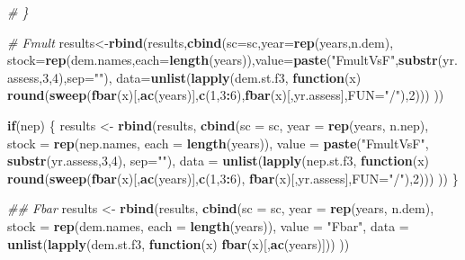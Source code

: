 \documentclass[
]{article}
\newenvironment{Shaded}{\begin{snugshade}}{\end{snugshade}}
\newcommand{\CommentTok}[1]{\textcolor[rgb]{0.56,0.35,0.01}{\textit{#1}}}
\newcommand{\ControlFlowTok}[1]{\textcolor[rgb]{0.13,0.29,0.53}{\textbf{#1}}}
\newcommand{\DataTypeTok}[1]{\textcolor[rgb]{0.13,0.29,0.53}{#1}}
\newcommand{\DecValTok}[1]{\textcolor[rgb]{0.00,0.00,0.81}{#1}}
\newcommand{\KeywordTok}[1]{\textcolor[rgb]{0.13,0.29,0.53}{\textbf{#1}}}
\newcommand{\NormalTok}[1]{#1}
\newcommand{\OperatorTok}[1]{\textcolor[rgb]{0.81,0.36,0.00}{\textbf{#1}}}
\newcommand{\StringTok}[1]{\textcolor[rgb]{0.31,0.60,0.02}{#1}}
\begin{document}
\begin{Shaded}
\begin{Highlighting}[]
{{{{{ \CommentTok{#   \}}

    \CommentTok{# Fmult}
\NormalTok{    results<-}\KeywordTok{rbind}\NormalTok{(results,}\KeywordTok{cbind}\NormalTok{(}\DataTypeTok{sc=}\NormalTok{sc,}\DataTypeTok{year=}\KeywordTok{rep}\NormalTok{(years,n.dem),}
                                 \DataTypeTok{stock=}\KeywordTok{rep}\NormalTok{(dem.names,}\DataTypeTok{each=}\KeywordTok{length}\NormalTok{(years)),}\DataTypeTok{value=}\KeywordTok{paste}\NormalTok{(}\StringTok{"FmultVsF"}\NormalTok{,}\KeywordTok{substr}\NormalTok{(yr.assess,}\DecValTok{3}\NormalTok{,}\DecValTok{4}\NormalTok{),}\DataTypeTok{sep=}\StringTok{""}\NormalTok{),}
                                 \DataTypeTok{data=}\KeywordTok{unlist}\NormalTok{(}\KeywordTok{lapply}\NormalTok{(dem.st.f3, }\ControlFlowTok{function}\NormalTok{(x) }\KeywordTok{round}\NormalTok{(}\KeywordTok{sweep}\NormalTok{(}\KeywordTok{fbar}\NormalTok{(x)[,}\KeywordTok{ac}\NormalTok{(years)],}\KeywordTok{c}\NormalTok{(}\DecValTok{1}\NormalTok{,}\DecValTok{3}\OperatorTok{:}\DecValTok{6}\NormalTok{),}\KeywordTok{fbar}\NormalTok{(x)[,yr.assess],}\DataTypeTok{FUN=}\StringTok{"/"}\NormalTok{),}\DecValTok{2}\NormalTok{)))}
\NormalTok{    ))}

    \ControlFlowTok{if}\NormalTok{(nep) \{}
\NormalTok{    results <-}\StringTok{ }\KeywordTok{rbind}\NormalTok{(results, }\KeywordTok{cbind}\NormalTok{(}\DataTypeTok{sc =}\NormalTok{ sc, }\DataTypeTok{year =} \KeywordTok{rep}\NormalTok{(years, n.nep),}
                    \DataTypeTok{stock =} \KeywordTok{rep}\NormalTok{(nep.names, }\DataTypeTok{each =} \KeywordTok{length}\NormalTok{(years)), }\DataTypeTok{value =} \KeywordTok{paste}\NormalTok{(}\StringTok{"FmultVsF"}\NormalTok{, }\KeywordTok{substr}\NormalTok{(yr.assess,}\DecValTok{3}\NormalTok{,}\DecValTok{4}\NormalTok{), }\DataTypeTok{sep=}\StringTok{""}\NormalTok{),}
                    \DataTypeTok{data =} \KeywordTok{unlist}\NormalTok{(}\KeywordTok{lapply}\NormalTok{(nep.st.f3, }\ControlFlowTok{function}\NormalTok{(x) }\KeywordTok{round}\NormalTok{(}\KeywordTok{sweep}\NormalTok{(}\KeywordTok{fbar}\NormalTok{(x)[,}\KeywordTok{ac}\NormalTok{(years)],}\KeywordTok{c}\NormalTok{(}\DecValTok{1}\NormalTok{,}\DecValTok{3}\OperatorTok{:}\DecValTok{6}\NormalTok{), }\KeywordTok{fbar}\NormalTok{(x)[,yr.assess],}\DataTypeTok{FUN=}\StringTok{"/"}\NormalTok{),}\DecValTok{2}\NormalTok{)))}
\NormalTok{                    ))}
\NormalTok{    \}}

    \CommentTok{## Fbar}
\NormalTok{    results <-}\StringTok{ }\KeywordTok{rbind}\NormalTok{(results, }\KeywordTok{cbind}\NormalTok{(}\DataTypeTok{sc =}\NormalTok{ sc, }\DataTypeTok{year =} \KeywordTok{rep}\NormalTok{(years, n.dem),}
                    \DataTypeTok{stock =} \KeywordTok{rep}\NormalTok{(dem.names, }\DataTypeTok{each =} \KeywordTok{length}\NormalTok{(years)), }\DataTypeTok{value =} \StringTok{"Fbar"}\NormalTok{,}
                    \DataTypeTok{data =} \KeywordTok{unlist}\NormalTok{(}\KeywordTok{lapply}\NormalTok{(dem.st.f3, }\ControlFlowTok{function}\NormalTok{(x) }\KeywordTok{fbar}\NormalTok{(x)[,}\KeywordTok{ac}\NormalTok{(years)]))}
\NormalTok{                    ))}

}}}}}
\end{Highlighting}
\end{Shaded}
\end{document}
